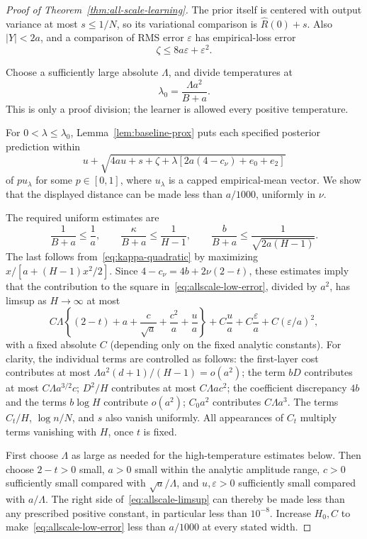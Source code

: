 \begin{proof}[Proof of Theorem~\ref{thm:all-scale-learning}]
The prior itself is centered with output variance at most $s\le1/N$, so its variational comparison is $\widehat R(0)+s$. Also $|Y|<2a$, and a comparison of RMS error $\varepsilon$ has empirical-loss error
\[
 \zeta\le8a\varepsilon+\varepsilon^2.
\]

Choose a sufficiently large absolute $\Lambda$, and divide temperatures at
\[
 \lambda_0=\frac{\Lambda a^2}{B+a}.
\]
This is only a proof division; the learner is allowed every positive temperature.

For $0<\lambda\le\lambda_0$, Lemma~\ref{lem:baseline-prox} puts each specified posterior prediction within
\begin{equation}
 u+\sqrt{4au+s+\zeta+
       \lambda[2a(4-c_\nu)+e_0+e_2]}
 \label{eq:allscale-low-error}
\end{equation}
of $p u_\lambda$ for some $p\in[0,1]$, where $u_\lambda$ is a capped empirical-mean vector. We show that the displayed distance can be made less than $a/1000$, uniformly in $\nu$.

The required uniform estimates are
\begin{equation}
 \frac1{B+a}\le\frac1a,\qquad
 \frac\kappa{B+a}\le\frac1{H-1},\qquad
 \frac b{B+a}\le\frac1{\sqrt{2a(H-1)}}.
 \label{eq:allscale-ratios}
\end{equation}
The last follows from~\eqref{eq:kappa-quadratic} by maximizing $x/[a+(H-1)x^2/2]$. Since
$4-c_\nu=4b+2\nu(2-t)$, these estimates imply that the contribution to the square in~\eqref{eq:allscale-low-error}, divided by $a^2$, has limsup as $H\to\infty$ at most
\begin{equation}
 C\Lambda\left\{(2-t)+a+\frac c{\sqrt a}+\frac{c^2}{a}+\frac ua\right\}
      +C\frac ua+C\frac\varepsilon a+C(\varepsilon/a)^2,
 \label{eq:allscale-limsup}
\end{equation}
with a fixed absolute $C$ (depending only on the fixed analytic constants). For clarity, the individual terms are controlled as follows: the first-layer cost contributes at most $\Lambda a^2(d+1)/(H-1)=o(a^2)$; the term $bD$ contributes at most $C\Lambda a^{3/2}c$; $D^2/H$ contributes at most $C\Lambda a c^2$; the coefficient discrepancy $4b$ and the terms $b\log H$ contribute $o(a^2)$; $C_0a^2$ contributes $C\Lambda a^3$. The terms $C_t/H$, $\log n/N$, and $s$ also vanish uniformly. All appearances of $C_t$ multiply terms vanishing with $H$, once $t$ is fixed.

First choose $\Lambda$ as large as needed for the high-temperature estimates below. Then choose $2-t>0$ small, $a>0$ small within the analytic amplitude range, $c>0$ sufficiently small compared with $\sqrt a/\Lambda$, and $u,\varepsilon>0$ sufficiently small compared with $a/\Lambda$. The right side of~\eqref{eq:allscale-limsup} can thereby be made less than any prescribed positive constant, in particular less than $10^{-8}$. Increase $H_0,C$ to make~\eqref{eq:allscale-low-error} less than $a/1000$ at every stated width.


\end{proof}
